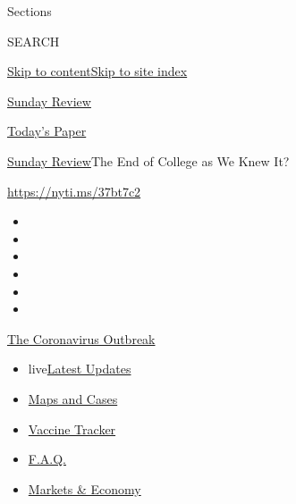 Sections

SEARCH

\protect\hyperlink{site-content}{Skip to
content}\protect\hyperlink{site-index}{Skip to site index}

\href{https://www.nytimes.com/section/opinion/sunday}{Sunday Review}

\href{https://myaccount.nytimes.com/auth/login?response_type=cookie\&client_id=vi}{}

\href{https://www.nytimes.com/section/todayspaper}{Today's Paper}

\href{/section/opinion/sunday}{Sunday Review}\textbar{}The End of
College as We Knew It?

\href{https://nyti.ms/37bt7c2}{https://nyti.ms/37bt7c2}

\begin{itemize}
\item
\item
\item
\item
\item
\item
\end{itemize}

\href{https://www.nytimes.com/news-event/coronavirus?action=click\&pgtype=Article\&state=default\&region=TOP_BANNER\&context=storylines_menu}{The
Coronavirus Outbreak}

\begin{itemize}
\tightlist
\item
  live\href{https://www.nytimes.com/2020/08/08/world/coronavirus-updates.html?action=click\&pgtype=Article\&state=default\&region=TOP_BANNER\&context=storylines_menu}{Latest
  Updates}
\item
  \href{https://www.nytimes.com/interactive/2020/us/coronavirus-us-cases.html?action=click\&pgtype=Article\&state=default\&region=TOP_BANNER\&context=storylines_menu}{Maps
  and Cases}
\item
  \href{https://www.nytimes.com/interactive/2020/science/coronavirus-vaccine-tracker.html?action=click\&pgtype=Article\&state=default\&region=TOP_BANNER\&context=storylines_menu}{Vaccine
  Tracker}
\item
  \href{https://www.nytimes.com/interactive/2020/world/coronavirus-tips-advice.html?action=click\&pgtype=Article\&state=default\&region=TOP_BANNER\&context=storylines_menu}{F.A.Q.}
\item
  \href{https://www.nytimes.com/live/2020/08/07/business/stock-market-today-coronavirus?action=click\&pgtype=Article\&state=default\&region=TOP_BANNER\&context=storylines_menu}{Markets
  \& Economy}
\end{itemize}


